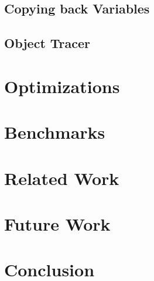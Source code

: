 \documentclass{sigplanconf}
\begin{document}
\subsection{Copying back Variables}
\label{sec:impl_copyback}

\subsection{Object Tracer}
\label{sec:impl_tracer}


\section{Optimizations}


\section{Benchmarks}

\section{Related Work}

\section{Future Work}

\section{Conclusion}




\end{document}
